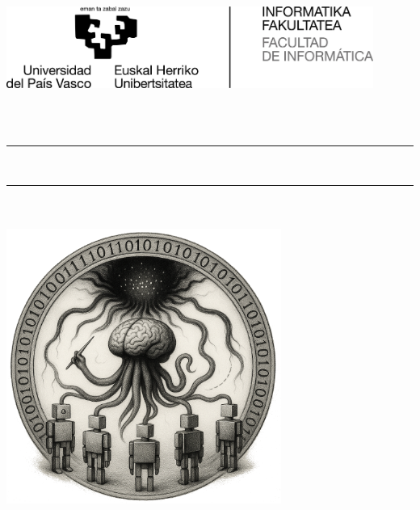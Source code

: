 \thispagestyle{empty}
\newcommand{\HRule}{\rule{\linewidth}{0.5mm}} 
\thispagestyle{empty}
\vspace*{-2cm}
\noindent
\begin{minipage}[c]{0.5\textwidth}
  \begin{flushleft}
    \includegraphics[width=0.9\textwidth]{config/FacultadInformatica-Gipuzkoa-bilingue-positivo-alta.jpg}
  \end{flushleft}
\end{minipage}%
\hfill
\begin{minipage}[c]{0.45\textwidth}
  \begin{center}
    {\Large {\gapizenburua}}\\[0.3cm]
    {\large \mbox{\ikasketak}}\\[0.2cm]
    {\espezialitatea}
  \end{center}
\end{minipage}

\vspace{0.5cm} %

\begin{center}
  \HRule \\[0.5cm]
  {\LARGE 
    \textbf{\izenburua}
  }
  \HRule \\[0.5cm]
  \Large \textsl{\egilea}\\[0.8cm] 

  \includegraphics[width=0.675\textwidth]{figures/portada.png} \\[0.8cm]
   
  
  \textbf{\zuzendariaktestua}\\
  \zuzendariak\\[1cm]
  
  \data
\end{center}
